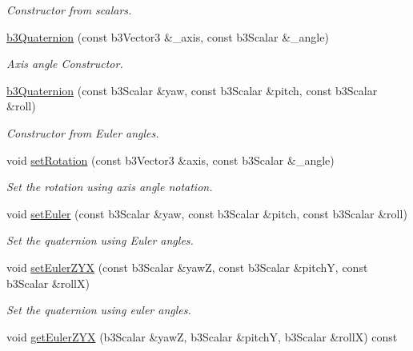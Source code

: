 \begin{CompactItemize}
\begin{CompactList}\small\item\em Constructor from scalars. \item\end{CompactList}\item 
\hyperlink{classb3_quaternion_e9b2568fec426fbb4574bdcbd1bad418}{b3Quaternion} (const b3Vector3 \&\_\-axis, const b3Scalar \&\_\-angle)
\begin{CompactList}\small\item\em Axis angle Constructor. \item\end{CompactList}\item 
\hyperlink{classb3_quaternion_05b0b4abc7eaf5cb9ba00ea3b2353908}{b3Quaternion} (const b3Scalar \&yaw, const b3Scalar \&pitch, const b3Scalar \&roll)
\begin{CompactList}\small\item\em Constructor from Euler angles. \item\end{CompactList}\item 
void \hyperlink{classb3_quaternion_af98a2aed426d63aacf993c354bb4571}{setRotation} (const b3Vector3 \&axis, const b3Scalar \&\_\-angle)
\begin{CompactList}\small\item\em Set the rotation using axis angle notation. \item\end{CompactList}\item 
void \hyperlink{classb3_quaternion_497ec9be887735d3655eb5f64bfb45bb}{setEuler} (const b3Scalar \&yaw, const b3Scalar \&pitch, const b3Scalar \&roll)
\begin{CompactList}\small\item\em Set the quaternion using Euler angles. \item\end{CompactList}\item 
void \hyperlink{classb3_quaternion_78e3817a97a72fd1e32d4d17e40be362}{setEulerZYX} (const b3Scalar \&yawZ, const b3Scalar \&pitchY, const b3Scalar \&rollX)
\begin{CompactList}\small\item\em Set the quaternion using euler angles. \item\end{CompactList}\item 
void \hyperlink{classb3_quaternion_6d11b2745e4a668ef7a1d6dd9d97f621}{getEulerZYX} (b3Scalar \&yawZ, b3Scalar \&pitchY, b3Scalar \&rollX) const 

\end{CompactItemize}
